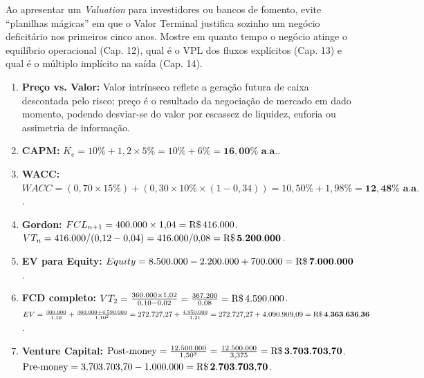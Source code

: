 \begin{boxDica}
Ao apresentar um \textit{Valuation} para investidores ou bancos de fomento, evite ``planilhas mágicas'' em que o Valor Terminal justifica sozinho um negócio deficitário nos primeiros cinco anos. Mostre em quanto tempo o negócio atinge o equilíbrio operacional (Cap. 12), qual é o VPL dos fluxos explícitos (Cap. 13) e qual é o múltiplo implícito na saída (Cap. 14).
\end{boxDica}

\clearpage
{}

\begin{boxGabarito}
\begin{enumerate}[leftmargin=1.5em, itemsep=4pt]
  \item \textbf{Preço vs. Valor:} Valor intrínseco reflete a geração futura de caixa descontada pelo risco; preço é o resultado da negociação de mercado em dado momento, podendo desviar-se do valor por escassez de liquidez, euforia ou assimetria de informação.
  \item \textbf{CAPM:} $K_e = 10\% + 1{,}2 \times 5\% = 10\% + 6\% = \mathbf{16{,}00\%\text{ a.a.}}$.
  \item \textbf{WACC:} $WACC = (0{,}70 \times 15\%) + (0{,}30 \times 10\% \times (1 - 0{,}34)) = 10{,}50\% + 1{,}98\% = \mathbf{12{,}48\%\text{ a.a.}}$.
  \item \textbf{Gordon:} $FCL_{n+1} = 400.000 \times 1{,}04 = \text{R\$\,}{416.000}$. $VT_n = 416.000 / (0{,}12 - 0{,}04) = 416.000 / 0{,}08 = \mathbf{\text{R\$\,}{5.200.000}}$.
  \item \textbf{EV para Equity:} $Equity = 8.500.000 - 2.200.000 + 700.000 = \mathbf{\text{R\$\,}{7.000.000}}$.
  \item \textbf{FCD completo:}
  $VT_2 = \frac{360.000 \times 1{,}02}{0{,}10 - 0{,}02} = \frac{367.200}{0{,}08} = \text{R\$\,}{4.590.000}$. \\
  $EV = \frac{300.000}{1{,}10} + \frac{360.000 + 4.590.000}{1{,}10^2} = 272.727{,}27 + \frac{4.950.000}{1{,}21} = 272.727{,}27 + 4.090.909{,}09 = \mathbf{\text{R\$\,}{4.363.636{,}36}}$.
  \item \textbf{Venture Capital:}
  $\text{Post-money} = \frac{12.500.000}{1{,}50^3} = \frac{12.500.000}{3{,}375} = \mathbf{\text{R\$\,}{3.703.703{,}70}}$. \\
  $\text{Pre-money} = 3.703.703{,}70 - 1.000.000 = \mathbf{\text{R\$\,}{2.703.703{,}70}}$. \\

\end{enumerate}
\end{boxGabarito}
